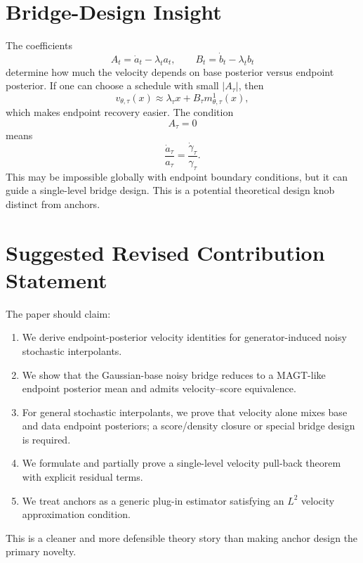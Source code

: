 \documentclass[11pt]{article}
\theoremstyle{plain}
\theoremstyle{definition}
\begin{document}
\section{Bridge-Design Insight}

The coefficients
\begin{equation}
A_t=\dot a_t-\lambda_ta_t,
\qquad
B_t=\dot b_t-\lambda_tb_t
\end{equation}
determine how much the velocity depends on base posterior versus endpoint
posterior. If one can choose a schedule with small \(|A_\tau|\), then
\begin{equation}
v_{\theta,\tau}(x)
\approx
\lambda_\tau x+B_\tau m_{\theta,\tau}^1(x),
\end{equation}
which makes endpoint recovery easier. The condition
\begin{equation}
A_\tau=0
\end{equation}
means
\begin{equation}
\frac{\dot a_\tau}{a_\tau}
=
\frac{\dot\gamma_\tau}{\gamma_\tau}.
\end{equation}
This may be impossible globally with endpoint boundary conditions, but it can
guide a single-level bridge design. This is a potential theoretical design knob
distinct from anchors.

\section{Suggested Revised Contribution Statement}

The paper should claim:
\begin{enumerate}
\item We derive endpoint-posterior velocity identities for generator-induced
noisy stochastic interpolants.
\item We show that the Gaussian-base noisy bridge reduces to a MAGT-like
endpoint posterior mean and admits velocity--score equivalence.
\item For general stochastic interpolants, we prove that velocity alone mixes
base and data endpoint posteriors; a score/density closure or special bridge
design is required.
\item We formulate and partially prove a single-level velocity pull-back theorem
with explicit residual terms.
\item We treat anchors as a generic plug-in estimator satisfying an \(L^2\)
velocity approximation condition.
\end{enumerate}

This is a cleaner and more defensible theory story than making anchor design the
primary novelty.
\end{document}
